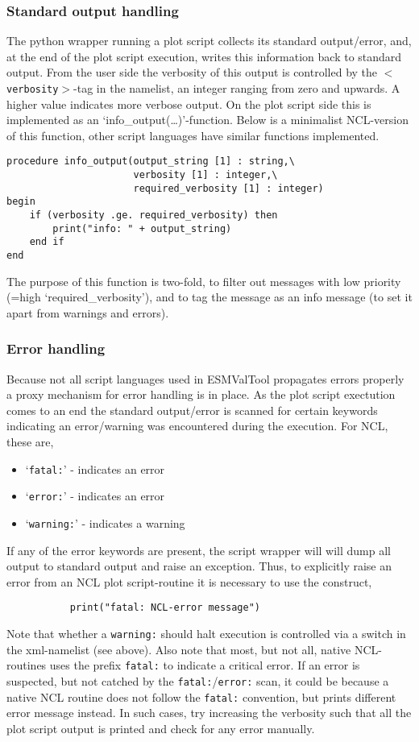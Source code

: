 \documentclass[12pt]{article}
\newcommand{\xmltag}[1]{\texttt{$<$#1$>$}}
\begin{document}
\subsubsection{Standard output handling}
The python wrapper running a plot script collects its standard
output/error, and, at the end of the plot script execution, writes
this information back to standard output. From the user side the
verbosity of this output is controlled by the \xmltag{verbosity}-tag
in the namelist, an integer ranging from zero and upwards. A higher
value indicates more verbose output. On the plot script side this is
implemented as an `info\_output(\ldots)'-function. Below is a
minimalist NCL-version of this function, other script
languages have similar functions implemented. 
\begin{Verbatim}
procedure info_output(output_string [1] : string,\
                      verbosity [1] : integer,\
                      required_verbosity [1] : integer)
begin
    if (verbosity .ge. required_verbosity) then
        print("info: " + output_string)
    end if
end
\end{Verbatim}
The purpose of this function is two-fold, to filter out messages with
low priority (=high `required\_verbosity'), and to tag the message as
an info message (to set it apart from warnings and errors).

\subsubsection{Error handling}
Because not all script languages used in ESMValTool propagates errors
properly a proxy mechanism for error handling is in place. As the plot
script exectution comes to an end the standard output/error  is
scanned for certain keywords indicating an error/warning was
encountered during the execution. For NCL, these are, 
\begin{itemize}
\item `\texttt{fatal:}' - indicates an error
\item `\texttt{error:}' - indicates an error
\item `\texttt{warning:}' - indicates a warning
\end{itemize}

If any of the error keywords are present, the script wrapper will
will dump all output to standard output and raise an
exception. Thus, to explicitly raise an error from an
NCL plot script-routine it is necessary to use the construct, 
\begin{Verbatim}
           print("fatal: NCL-error message")
\end{Verbatim}
Note that whether a \texttt{warning:} should halt execution is
controlled via a switch in the xml-namelist (see above). Also note
that most, but not all, native NCL-routines uses the prefix
\texttt{fatal:} to indicate a critical error. If an error is
suspected, but not catched by the \texttt{fatal:}/\texttt{error:}
scan, it could be because a native NCL routine does not follow the
\texttt{fatal:} convention, but prints different error message
instead. In such cases, try increasing the verbosity such that all
the plot script output is printed and check for any error manually.
\end{document}
